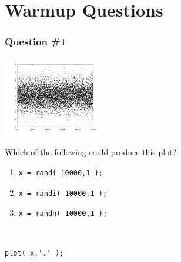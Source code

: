 \documentclass[11pt]{beamer}
\begin{document}
\section{Warmup Questions}

\begin{frame}[fragile]
  \frametitle{Question \#1}
  \Enlarge

  \includegraphics[width=0.33\textwidth]{./img/plot-normal.png}

Which of the following could produce this plot?

  \begin{enumerate}[label=\Alph*]
    \item
      \begin{Verbatim}
x = rand( 10000,1 );
      \end{Verbatim}
    \item
      \begin{Verbatim}
x = randi( 10000,1 );
      \end{Verbatim}
    \item
    \begin{Verbatim}
x = randn( 10000,1 );
    \end{Verbatim}
  \end{enumerate}
  ~
  \begin{Verbatim}
plot( x,'.' );
  \end{Verbatim}
\end{frame}
\end{document}
